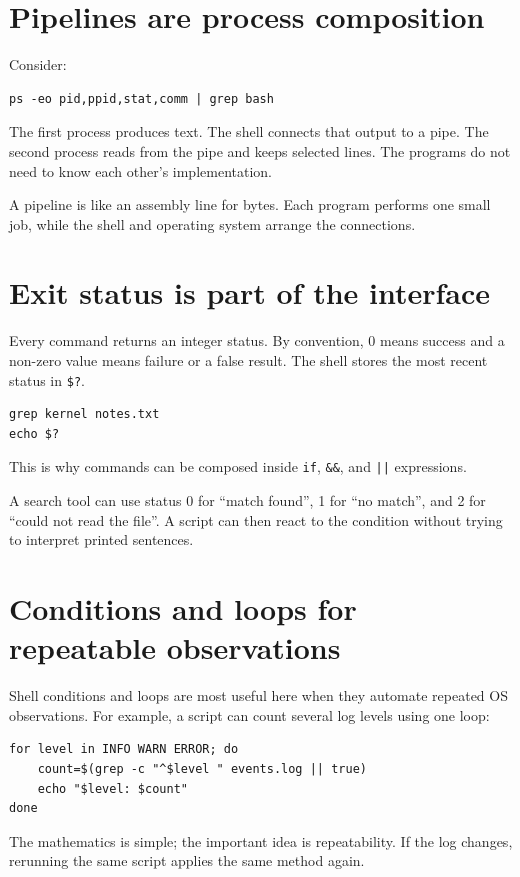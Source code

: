 \section{Pipelines are process composition}
Consider:
\begin{lstlisting}[style=utpbash]
ps -eo pid,ppid,stat,comm | grep bash
\end{lstlisting}
The first process produces text. The shell connects that output to a pipe. The second process reads from the pipe and keeps selected lines. The programs do not need to know each other's implementation.

\begin{intuition}
A pipeline is like an assembly line for bytes. Each program performs one small job, while the shell and operating system arrange the connections.
\end{intuition}

\section{Exit status is part of the interface}
Every command returns an integer status. By convention, 0 means success and a non-zero value means failure or a false result. The shell stores the most recent status in \texttt{\$?}.

\begin{lstlisting}[style=utpbash]
grep kernel notes.txt
echo $?
\end{lstlisting}
This is why commands can be composed inside \texttt{if}, \texttt{\&\&}, and \texttt{||} expressions.

\begin{workedexample}
A search tool can use status 0 for ``match found'', 1 for ``no match'', and 2 for ``could not read the file''. A script can then react to the condition without trying to interpret printed sentences.
\end{workedexample}

\section{Conditions and loops for repeatable observations}
Shell conditions and loops are most useful here when they automate repeated OS observations. For example, a script can count several log levels using one loop:
\begin{lstlisting}[style=utpbash]
for level in INFO WARN ERROR; do
    count=$(grep -c "^$level " events.log || true)
    echo "$level: $count"
done
\end{lstlisting}
The mathematics is simple; the important idea is repeatability. If the log changes, rerunning the same script applies the same method again.

